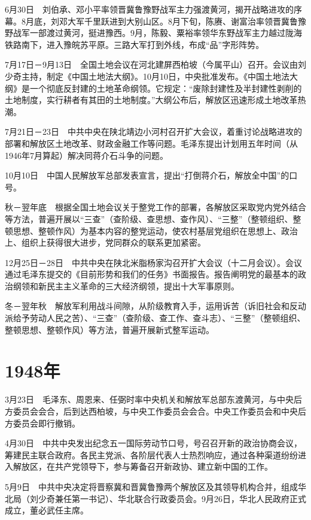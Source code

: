 \documentclass[10pt,a4paper,twocolumn]{book}
\begin{document}
6月30日　刘伯承、邓小平率领晋冀鲁豫野战军主力强渡黄河，揭开战略进攻的序幕。8月底，刘邓大军千里跃进到大别山区。8月下旬，陈赓、谢富治率领晋冀鲁豫野战军一部渡过黄河，挺进豫西。9月，陈毅、粟裕率领华东野战军主力越过陇海铁路南下，进入豫皖苏平原。三路大军打到外线，布成“品”字形阵势。

7月17日－9月13日　全国土地会议在河北建屏西柏坡（今属平山）召开。会议由刘少奇主持，制定《中国土地法大纲》。10月10日，中央批准发布。《中国土地法大纲》是一个彻底反封建的土地革命纲领。它规定：“废除封建性及半封建性剥削的土地制度，实行耕者有其田的土地制度。”大纲公布后，解放区迅速形成土地改革热潮。

7月21日－23日　中共中央在陕北靖边小河村召开扩大会议，着重讨论战略进攻的部署和解放区土地改革、财政金融工作等问题。毛泽东提出计划用五年时间（从1946年7月算起）解决同蒋介石斗争的问题。

10月10日　中国人民解放军总部发表宣言，提出“打倒蒋介石，解放全中国”的口号。

秋－翌年底　根据全国土地会议关于整党工作的部署，各解放区采取党内党外结合等方法，普遍开展以“三查”（查阶级、查思想、查作风）、“三整”（整顿组织、整顿思想、整顿作风）为基本内容的整党运动，使农村基层党组织在思想上、政治上、组织上获得很大进步，党同群众的联系更加紧密。

12月25日－28日　中共中央在陕北米脂杨家沟召开扩大会议（十二月会议）。会议通过毛泽东提交的《目前形势和我们的任务》书面报告。报告阐明党的最基本的政治纲领和新民主主义革命的三大经济纲领，提出十大军事原则。

冬－翌年秋　解放军利用战斗间隙，从阶级教育入手，运用诉苦（诉旧社会和反动派给予劳动人民之苦）、“三查”（查阶级、查工作、查斗志）、“三整”（整顿组织、整顿思想、整顿作风）等方法，普遍开展新式整军运动。

\section{1948年}

3月23日　毛泽东、周恩来、任弼时率中央机关和解放军总部东渡黄河，与中央后方委员会会合，后到达西柏坡，与中央工作委员会会合。中央工作委员会和中央后方委员会即行撤销。

4月30日　中共中央发出纪念五一国际劳动节口号，号召召开新的政治协商会议，筹建民主联合政府。各民主党派、各阶层代表人士热烈响应，通过各种渠道纷纷进入解放区，在共产党领导下，参与筹备召开新政协、建立新中国的工作。

5月9日　中共中央决定将晋察冀和晋冀鲁豫两个解放区及其领导机构合并，组成华北局（刘少奇兼任第一书记）、华北联合行政委员会。9月26日，华北人民政府正式成立，董必武任主席。
\end{document}
